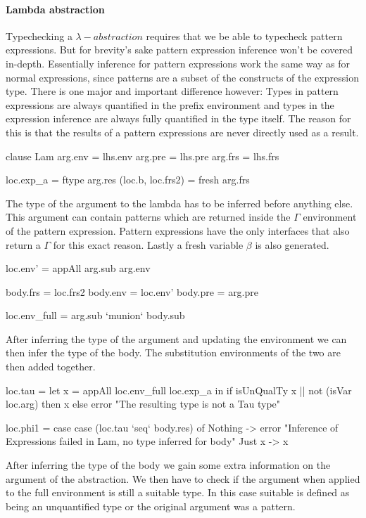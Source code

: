 \paragraph{Lambda abstraction}
Typechecking a $\lambda-abstraction$ requires that we be able to typecheck pattern expressions. But for brevity's sake pattern expression inference won't be covered in-depth. Essentially inference for pattern expressions work the same way as for normal expressions, since patterns are a subset of the constructs of the expression type. There is one major and important difference however: Types in pattern expressions are always quantified in the prefix environment and types in the expression inference are always fully quantified in the type itself. The reason for this is that the results of a pattern expressions are never directly used as a result.

\begin{code}
    clause Lam
        arg.env = lhs.env
        arg.pre = lhs.pre
        arg.frs = lhs.frs
   
       loc.exp_a = ftype arg.res
       (loc.b, loc.frs2) = fresh arg.frs
\end{code}
The type of the argument to the lambda has to be inferred before anything else. This argument can contain patterns which are returned inside the $\Gamma$ environment of the pattern expression. Pattern expressions have the only interfaces that also return a $\Gamma$ for this exact reason. Lastly a fresh variable $\beta$ is also generated.
       
\begin{code}
       loc.env'          = appAll arg.sub arg.env
       
       body.frs = loc.frs2
       body.env = loc.env'
       body.pre = arg.pre
       
       loc.env_full = arg.sub `munion` body.sub
\end{code}
After inferring the type of the argument and updating the environment we can then infer the type of the body. The substitution environments of the two are then added together.     

\begin{code}
       loc.tau = let x = appAll loc.env_full loc.exp_a
                 in if isUnQualTy x || not (isVar loc.arg)
                       then x
                       else error "The resulting type is not a Tau type"
                       
       loc.phi1 = case  case (loc.tau `seq` body.res) of
                     Nothing -> error "Inference of Expressions failed in Lam, no type inferred for body"
                     Just x  -> x
\end{code}
After inferring the type of the body we gain some extra information on the argument of the abstraction. We then have to check if the argument when applied to the full environment is still a suitable type. In this case suitable is defined as being an unquantified type or the original argument was a pattern.

